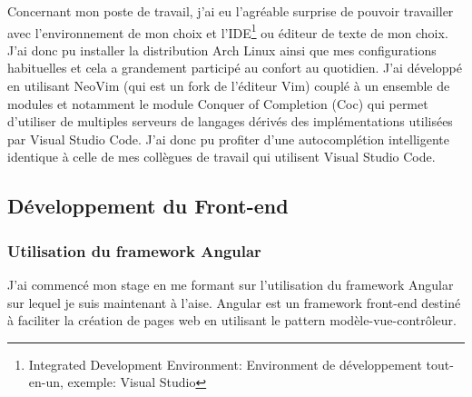 \documentclass[12pt, a4paper]{report}
\newcommand\tab[1][1cm]{\hspace*{#1}}
\begin{document}
\tab{}Concernant mon poste de travail, j'ai eu l'agréable surprise de pouvoir travailler avec l'environnement de mon choix et l'IDE\footnote{Integrated Development Environment: Environment de développement tout-en-un, exemple: Visual Studio} ou éditeur de texte de mon choix. J'ai donc pu installer la distribution Arch Linux ainsi que mes configurations habituelles et cela a grandement participé au confort au quotidien. J'ai développé en utilisant NeoVim (qui est un fork de l'éditeur Vim) couplé à un ensemble de modules et notamment le module Conquer of Completion (Coc) qui permet d'utiliser de multiples serveurs de langages dérivés des implémentations utilisées par Visual Studio Code. J'ai donc pu profiter d'une autocomplétion intelligente identique à celle de mes collègues de travail qui utilisent Visual Studio Code.


\subsection{Développement du Front-end}
\subsubsection{Utilisation du framework Angular}
\tab{}J'ai commencé mon stage en me formant sur l'utilisation du framework Angular sur lequel je suis maintenant à l'aise.\newline
Angular est un framework front-end destiné à faciliter la création de pages web en utilisant le pattern modèle-vue-contrôleur.
\end{document}

